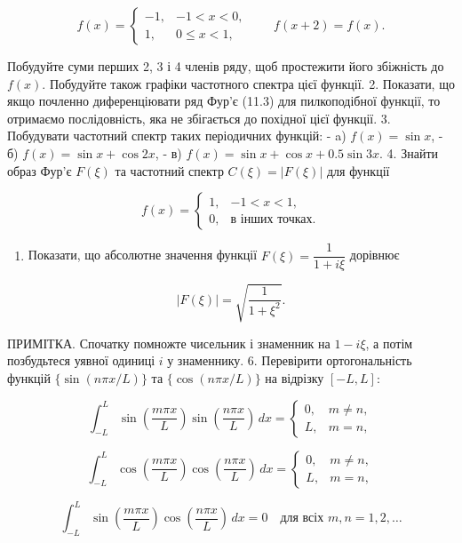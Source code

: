 \[
f(x)=
\begin{cases}
-1, & -1 < x < 0,\\
1, & 0 \le x < 1,
\end{cases}
\qquad
f(x+2)=f(x).
\]

Побудуйте суми перших 2, 3 і 4 членів ряду, щоб простежити його збіжність до \(f(x)\). Побудуйте також графіки частотного спектра цієї функції. 2. Показати, що якщо почленно диференціювати ряд Фур'є (11.3) для пилкоподібної функції, то отримаємо послідовність, яка не збігається до похідної цієї функції. 3. Побудувати частотний спектр таких періодичних функцій: - a) \(f(x)=\sin x\), - б) \(f(x)=\sin x+\cos 2x\), - в) \(f(x)=\sin x+\cos x+0.5\sin 3x\). 4. Знайти образ Фур'є \(F(\xi)\) та частотний спектр \(C(\xi)=|F(\xi)|\) для функції

\[
f(x)=
\begin{cases}
1, & -1 < x < 1,\\
0, & \text{в інших точках.}
\end{cases}
\]

\begin{enumerate}
\def\labelenumi{\arabic{enumi}.}
\setcounter{enumi}{4}
\tightlist
\item
  Показати, що абсолютне значення функції \(F(\xi)=\dfrac{1}{1+i\xi}\) дорівнює
\end{enumerate}

\[
\left|F(\xi)\right| = \sqrt{\frac{1}{1+\xi^2}}.
\]

ПРИМІТКА. Спочатку помножте чисельник і знаменник на \(1-i\xi\), а потім позбудьтеся уявної одиниці \(i\) у знаменнику. 6. Перевірити ортогональність функцій \(\{\sin(n\pi x/L)\}\) та \(\{\cos(n\pi x/L)\}\) на відрізку \([-L,L]\):

\[
\int_{-L}^{L} \sin\!\left(\frac{m\pi x}{L}\right)\sin\!\left(\frac{n\pi x}{L}\right)\,dx =
\begin{cases}
0, & m \neq n,\\
L, & m = n,
\end{cases}
\]

\[
\int_{-L}^{L} \cos\!\left(\frac{m\pi x}{L}\right)\cos\!\left(\frac{n\pi x}{L}\right)\,dx =
\begin{cases}
0, & m \neq n,\\
L, & m = n,
\end{cases}
\]

\[
\int_{-L}^{L} \sin\!\left(\frac{m\pi x}{L}\right)\cos\!\left(\frac{n\pi x}{L}\right)\,dx = 0
\quad \text{для всіх } m,n=1,2,\dots
\]

